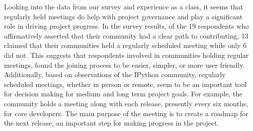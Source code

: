 
\noindent Looking into the data from our survey and experience as a class, it seems that regularly held meetings do help with project governance and play a significant role in driving project progress. In the survey results, of the 19 respondents who affirmatively asserted that their community had a clear path to contributing, 13 claimed that their communities held a regularly scheduled meeting while only 6 did not. This suggests that respondents involved in communities holding regular meetings, found the joining process to be easier, simpler, or more user friendly. Additionally, based on observations of the IPython community, regularly scheduled meetings, whether in person or remote, seem to be an important tool for decision making for medium and long term project goals. For example, the community holds a meeting along with each release, presently every six months, for core developers. The main purpose of the meeting is to create a roadmap for the next release, an important step for making progress in the project.
